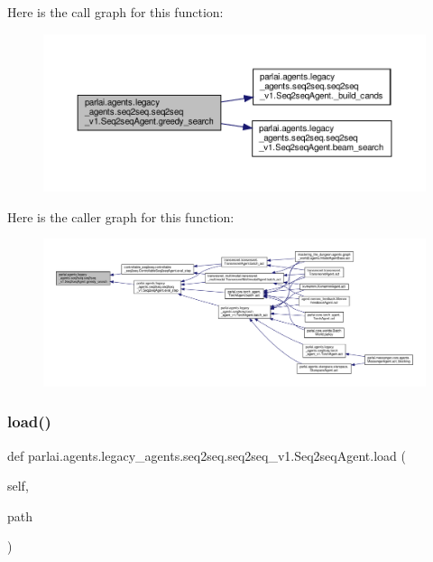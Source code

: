 Here is the call graph for this function\+:
\nopagebreak
\begin{figure}[H]
\begin{center}
\leavevmode
\includegraphics[width=350pt]{classparlai_1_1agents_1_1legacy__agents_1_1seq2seq_1_1seq2seq__v1_1_1Seq2seqAgent_a6afc143cc0ec59803be416416ce1ec97_cgraph}
\end{center}
\end{figure}
Here is the caller graph for this function\+:
\nopagebreak
\begin{figure}[H]
\begin{center}
\leavevmode
\includegraphics[width=350pt]{classparlai_1_1agents_1_1legacy__agents_1_1seq2seq_1_1seq2seq__v1_1_1Seq2seqAgent_a6afc143cc0ec59803be416416ce1ec97_icgraph}
\end{center}
\end{figure}
\mbox{\label{classparlai_1_1agents_1_1legacy__agents_1_1seq2seq_1_1seq2seq__v1_1_1Seq2seqAgent_a3ee5ae38c0e37bcc1e4eb44bae8a3cce}} 
\subsubsection{\texorpdfstring{load()}{load()}}
{\footnotesize\ttfamily def parlai.\+agents.\+legacy\+\_\+agents.\+seq2seq.\+seq2seq\+\_\+v1.\+Seq2seq\+Agent.\+load (\begin{DoxyParamCaption}\item[{}]{self,  }\item[{}]{path }\end{DoxyParamCaption})}

